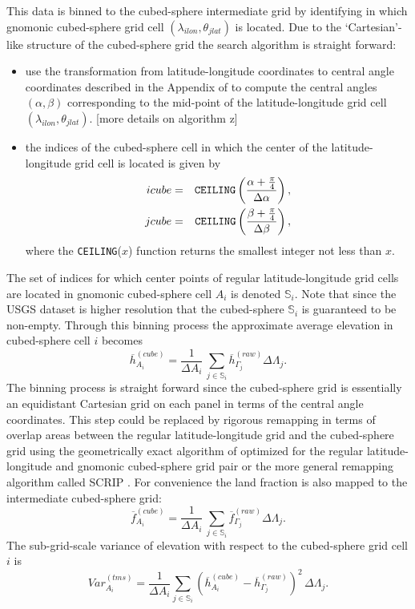 \documentclass[gmd]{copernicus}
\begin{document}
This data is binned to the cubed-sphere intermediate grid by identifying in  which gnomonic cubed-sphere grid cell $(\lambda_{ilon},\theta_{jlat})$ is located. Due to the `Cartesian'-like structure of the cubed-sphere grid the search algorithm is straight forward:
\begin{itemize}
\item  use the transformation from latitude-longitude coordinates to central angle coordinates described in the Appendix of \cite{NTL2005MWRb} to compute the central angles $(\alpha, \beta)$ corresponding to the mid-point of the latitude-longitude grid cell $(\lambda_{ilon},\theta_{jlat})$.  [more details on algorithm z]
\item the indices of the cubed-sphere cell in which the center of the latitude-longitude grid cell is located is given by  
\begin{eqnarray*} 
icube &=& \verb+CEILING+\left(\frac{\alpha + \frac{\pi}{4}}{\Delta \alpha}\right),\\
jcube &=& \verb+CEILING+\left(\frac{\beta  + \frac{\pi}{4}}{\Delta \beta}\right),
\end{eqnarray*}
where the \verb+CEILING+($x$) function returns the smallest integer not less than $x$. 
\end{itemize}
The set of indices for which center points of regular latitude-longitude grid cells are located in gnomonic cubed-sphere cell $A_i$ is denoted ${\mathbb{S}}_i$. Note that since the USGS dataset is higher resolution that the cubed-sphere ${\mathbb{S}}_i$ is guaranteed to be non-empty. Through this binning process the approximate average elevation in cubed-sphere cell $i$ becomes
\begin{equation}
\overline{h}^{(cube)}_{A_i}=\frac{1}{\Delta A_i}\, \sum_{j\in {\mathbb{S}}_i}{\overline{h}}^{(raw)}_{\Gamma_j}\Delta \Lambda_j.
\end{equation}
The binning process is straight forward since the cubed-sphere grid is essentially an equidistant Cartesian grid on each panel in terms of the central angle coordinates. This step could be replaced by rigorous remapping in terms of overlap areas between the regular latitude-longitude grid and the cubed-sphere grid using the geometrically exact algorithm of \citep{ULJ2009MWR} optimized for the regular latitude-longitude and gnomonic cubed-sphere grid pair or the more general remapping algorithm called SCRIP \citep{J1999MWR}. For convenience the land fraction is also mapped to the intermediate cubed-sphere grid:
\begin{equation}
\overline{f}^{(cube)}_{A_i}=\frac{1}{\Delta A_i}\, \sum_{j\in {\mathbb{S}}_i}{\overline{f}}^{(raw)}_{\Gamma_j}\Delta \Lambda_j.
\end{equation}
The sub-grid-scale variance of elevation with respect to the cubed-sphere grid cell $i$ is
\begin{equation}
Var^{(tms)}_{A_i}=\frac{1}{\Delta A_i}\sum_{j\in {\mathbb{S}}_i} \left( \overline{h}_{A_i}^{(cube)}-{\overline{h}}^{(raw)}_{\Gamma_j}\right)^2\, \Delta \Lambda_j.
\end{equation}
\end{document}
